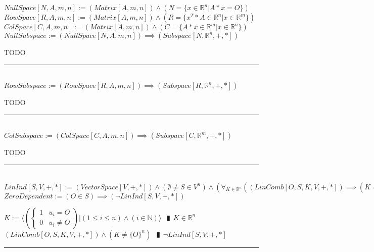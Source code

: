 \documentclass{book}
\newcommand{\abr}{:=}
\newcommand{\pipe}{$\phantom{(}\vrectangleblack\phantom{)}$}
\begin{document}
$NullSpace[N, A, m, n] \abr (Matrix[A, m, n]) \land (N = \{x \in \mathbb{R}^n | A * x = O\})$ \\  %
$RowSpace[R, A, m, n] \abr (Matrix[A, m, n]) \land (R = \{x^T * A \in \mathbb{R}^n | x \in \mathbb{R}^m\})$ \\  %
$ColSpace[C, A, m, n] \abr (Matrix[A, m, n]) \land (C = \{A * x \in \mathbb{R}^m | x \in \mathbb{R}^n\})$ \\  %

$NullSubspace \abr (NullSpace[N, A, m, n]) \implies (Subspace[N, \mathbb{R}^n, +, *])$
\begin{enumerate}
  \lit TODO
\end{enumerate} \vspace{.75mm} \hrule \vspace{.75mm} \ \\ 

$RowSubspace \abr (RowSpace[R, A, m, n]) \implies (Subspace[R, \mathbb{R}^n, +, *])$
\begin{enumerate}
  \lit TODO
\end{enumerate} \vspace{.75mm} \hrule \vspace{.75mm} \ \\ 

$ColSubspace \abr (ColSpace[C, A, m, n]) \implies (Subspace[C, \mathbb{R}^m, +, *])$
\begin{enumerate}
  \lit TODO
\end{enumerate} \vspace{.75mm} \hrule \vspace{.75mm} \ \\ 

$LinInd[S, V, +, *] \abr (VectorSpace[V, +, *]) \land (\emptyset \neq S \in V^n) \land (\forall_{K \in \mathbb{R}^n}((LinComb[O, S, K, V, +, *]) \implies (K = \{0\}^n)))$ \\

$ZeroDependent \abr (O \in S) \implies (\lnot LinInd[S, V, +, *])$
\begin{enumerate}
  \lit $K \abr \langle \left(\begin{cases} 
      1 & u_i = O \\
      0 & u_i \neq O 
    \end{cases}\right) | (1 \leq i \leq n) \land (i \in \mathbb{N}) \rangle$ \pipe $K \in \mathbb{R}^n$
  \lit $(LinComb[O, S, K, V, +, *]) \land (K \neq \{O\}^n)$ \pipe $\lnot LinInd[S, V, +, *]$
\end{enumerate} \vspace{.75mm} \hrule \vspace{.75mm} \ \\ 
\end{document}
